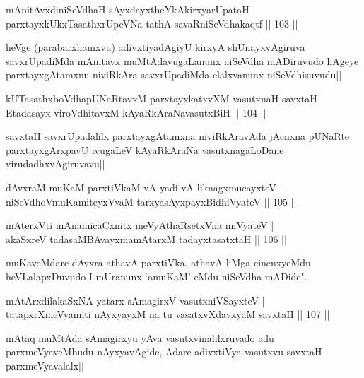 \begin{shl}
mAnitAvxdiniSeVdhaH sAyxdayxtheYkAkirxyarUpataH |\\
parxtayxkUkxTasathxrUpeVNa tathA savaRniSeVdhakaqtf \hfill || 103 ||
\end{shl}

\begin{artha}
heVge (parabarxhamxvu) adivxtiyadAgiyU kirxyA shUnayxvAgiruva savxrUpadiMda mAnitavx muMtAdavugaLanunx niSeVdha mADiruvudo hAgeye parxtayxgAtamxnu niviRkAra savxrUpadiMda elalxvanunx niSeVdhisuvudu||
\end{artha}


\begin{shl}
kUTasathxboVdhapUNaRtavxM parxtayxkatxvXM vasutxnaH savxtaH |\\
Etadasayx viroVdhitavxM kAyaRkAraNavasutxBiH \hfill || 104 ||
\end{shl}

\begin{artha}
savxtaH savxrUpadalilx parxtayxgAtamxna niviRkAravAda jAcnxna pUNaRte parxtayxgArxpavU ivugaLeV kAyaRkAraNa vasutxnagaLoDane virudadhxvAgiruvavu||
\end{artha}

\begin{shl}
dAvxraM muKaM parxtiVkaM vA yadi vA liknagxmucayxteV |\\
niSeVdhoV\s muKamiteyxVvaM tarxyasAyxpayxBidhiVyateV \hfill || 105 ||
\end{shl}

\begin{shl}
mAterxVti mAnamicaCxnitx meVyA\s thaRsetxVna miVyateV |\\
akaSxreV tadasaMBAvayxmamAtarxM tadayxtasatxtaH \hfill || 106 ||
\end{shl}

\begin{artha}
muKaveMdare dAvxra athavA parxtiVka, athavA liMga cinenxyeMdu heVLalapxDuvudo I mUranunx `amuKaM' eMdu niSeVdha mADide".
\end{artha}

\begin{shl}
mAtArxdilakaSxNA yatarx sAmagirxV vasutxniVSayxteV |\\
tatapxrXmeVyamiti nAyxyayxM na tu vasatxvXdavxyaM savxtaH \hfill || 107 ||
\end{shl}

\begin{artha}
mAtaq muMtAda sAmagirxyu yAva vasutxvinalilxruvado adu parxmeVyaveMbudu nAyxyavAgide, Adare adivxtiVya vasutxvu savxtaH parxmeVyavalalx||
\end{artha}

